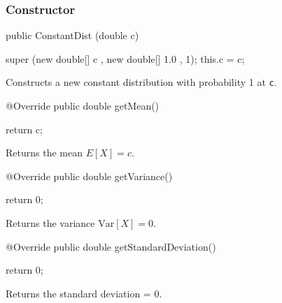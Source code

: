 {\subsubsection* {Constructor}

\begin{code}

   public ConstantDist (double c)\begin{hide} {
      super (new double[] { c }, new double[] { 1.0 }, 1);
      this.c = c;
   }\end{hide}
\end{code}
  \begin{tabb} Constructs a new constant distribution with probability 1 at \texttt{c}.
  \end{tabb}



\begin{code}

   @Override
   public double getMean()\begin{hide} {
      return c;
   }\end{hide}
\end{code}
\begin{tabb}  Returns the mean $E[X] = c$.
\end{tabb}
\begin{htmlonly}
\end{htmlonly}
\begin{code}

   @Override
   public double getVariance()\begin{hide}  {
      return 0;
   }\end{hide}
\end{code}
\begin{tabb}  Returns the variance $\mbox{Var}[X] = 0$.
\end{tabb}
\begin{htmlonly}
\end{htmlonly}
\begin{code}

   @Override
   public double getStandardDeviation()\begin{hide} {
      return 0;
   }\end{hide}
\end{code}
\begin{tabb}  Returns the standard deviation = 0.
\end{tabb}
\begin{htmlonly}
\end{htmlonly}
\begin{code}


\end{code}}
